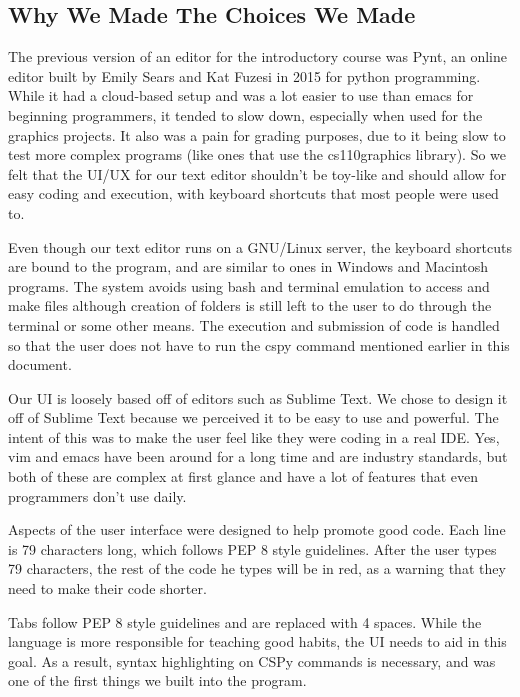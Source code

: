 \documentclass{article}
\begin{document}
\subsection{Why We Made The Choices We Made}
The previous version of an editor for the introductory course was Pynt, an online editor built by Emily Sears and Kat Fuzesi in 2015 for python programming. While it had a cloud-based setup and was a lot easier to use than emacs for beginning programmers, it tended to slow down, especially when used for the graphics projects. It also was a pain for grading purposes, due to it being slow to test more complex programs (like ones that use the cs110graphics library). So we felt that the UI/UX for our text editor shouldn't be toy-like and should allow for easy coding and execution, with keyboard shortcuts that most people were used to. 

Even though our text editor runs on a GNU/Linux server, the keyboard shortcuts are bound to the program, and are similar to ones in Windows and Macintosh programs. The system avoids using bash and terminal emulation to access and make files although creation of folders is still left to the user to do through the terminal or some other means. The execution and submission of code is handled so that the user does not have to run the cspy command mentioned earlier in this document.

Our UI is loosely based off of editors such as Sublime Text. We chose to design it off of Sublime Text because we perceived it to be easy to use and powerful. The intent of this was to make the user feel like they were coding in a real IDE. Yes, vim and emacs have been around for a long time and are industry standards, but both of these are complex at first glance and have a lot of features that even programmers don't use daily.

Aspects of the user interface were designed to help promote good code. Each line is 79 characters long, which follows PEP 8 style guidelines. After the user types 79 characters, the rest of the code he types will be in red, as a warning that they need to make their code shorter.

Tabs follow PEP 8 style guidelines and are replaced with 4 spaces. While the language is more responsible for teaching good habits, the UI needs to aid in this goal. As a result, syntax highlighting on CSPy commands is necessary, and was one of the first things we built into the program.
\end{document}
